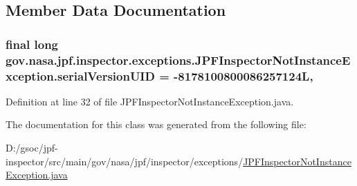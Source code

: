 \subsection{Member Data Documentation}
\subsubsection[{\texorpdfstring{serial\+Version\+U\+ID}{serialVersionUID}}]{\setlength{\rightskip}{0pt plus 5cm}final long gov.\+nasa.\+jpf.\+inspector.\+exceptions.\+J\+P\+F\+Inspector\+Not\+Instance\+Exception.\+serial\+Version\+U\+ID = -\/8178100800086257124L\hspace{0.3cm}{\ttfamily [static]}, {\ttfamily [private]}}\hypertarget{classgov_1_1nasa_1_1jpf_1_1inspector_1_1exceptions_1_1_j_p_f_inspector_not_instance_exception_a6d60206b645ca7772f9b069ae5057d07}{}\label{classgov_1_1nasa_1_1jpf_1_1inspector_1_1exceptions_1_1_j_p_f_inspector_not_instance_exception_a6d60206b645ca7772f9b069ae5057d07}


Definition at line 32 of file J\+P\+F\+Inspector\+Not\+Instance\+Exception.\+java.



The documentation for this class was generated from the following file\+:\begin{DoxyCompactItemize}
\item 
D\+:/gsoc/jpf-\/inspector/src/main/gov/nasa/jpf/inspector/exceptions/\hyperlink{_j_p_f_inspector_not_instance_exception_8java}{J\+P\+F\+Inspector\+Not\+Instance\+Exception.\+java}\end{DoxyCompactItemize}
